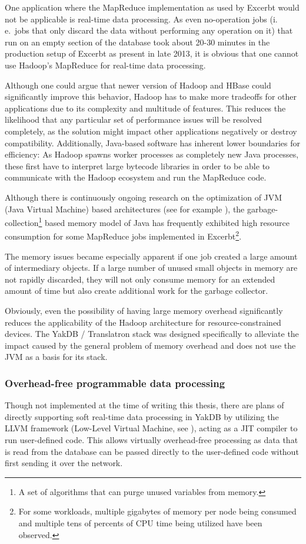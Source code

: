 \documentclass[a4paper, 12pt, twoside, reqn]{report}
\numberwithin{figure}{chapter}
\newtheorem[L]{boxedDefinition}{Definition}
\newtheorem[L]{boxedExample}{Example}
\newcommand{\ie}{i.\,e.\ }
\begin{document}
One application where the MapReduce implementation as used by Excerbt would not be applicable is real-time data processing. As even no-operation jobs (\ie jobs that only discard the data without performing any operation on it) that run on an empty section of the database took about 20-30 minutes in the production setup of Excerbt as present in late 2013, it is obvious that one cannot use Hadoop's MapReduce for real-time data processing.

Although one could argue that newer version of Hadoop and HBase could significantly improve this behavior, Hadoop has to make more tradeoffs for other applications due to its complexity and multitude of features. This reduces the likelihood that any particular set of performance issues will be resolved completely, as the solution might impact other applications negatively or destroy compatibility. Additionally, Java-based software has inherent lower boundaries for efficiency: As Hadoop spawns worker processes as completely new Java processes, these first have to interpret large bytecode libraries in order to be able to communicate with the Hadoop ecosystem and run the MapReduce code.

Although there is continuously ongoing research on the optimization of JVM (Java Virtual Machine) based architectures (see for example \cite{inoue2012adaptive}), the garbage-collection\footnote{A set of algorithms that can purge unused variables from memory.} based memory model of Java has frequently exhibited high resource consumption for some MapReduce jobs implemented in Excerbt\footnote{For some workloads, multiple gigabytes of memory per node being consumed and multiple tens of percents of CPU time being utilized have been observed.}.

The memory issues became especially apparent if one job created a large amount of intermediary objects. If a large number of unused small objects in memory are not rapidly discarded, they will not only consume memory for an extended amount of time but also create additional work for the garbage collector.

Obviously, even the possibility of having large memory overhead significantly reduces the applicability of the Hadoop architecture for resource-constrained devices. The YakDB / Translatron stack was designed specifically to alleviate the impact caused by the general problem of memory overhead and does not use the JVM as a basis for its stack.

\subsubsection{Overhead-free programmable data processing}\label{sssec:llvm}
Though not implemented at the time of writing this thesis, there are plans of directly supporting soft real-time data processing in YakDB by utilizing the LLVM framework (Low-Level Virtual Machine, see \cite{lattner2004llvm}), acting as a JIT compiler to run user-defined code. This allows virtually overhead-free processing as data that is read from the database can be passed directly to the user-defined code without first sending it over the network.
\end{document}

